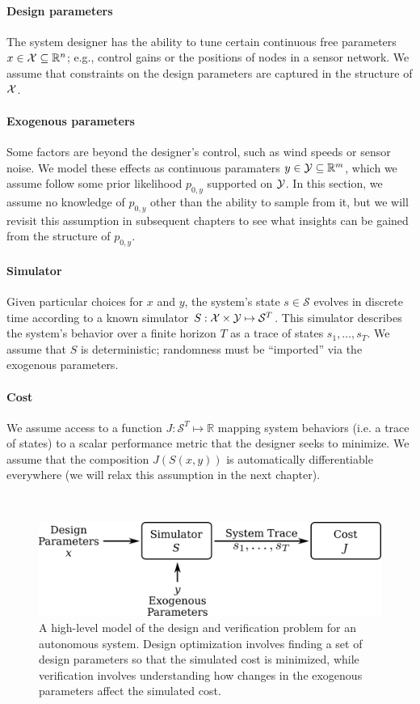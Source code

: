 \paragraph{Design parameters} The system designer has the ability to tune certain continuous free parameters $x \in \mathcal{X} \subseteq \mathbb{R}^n$; e.g., control gains or the positions of nodes in a sensor network. We assume that constraints on the design parameters are captured in the structure of $\mathcal{X}$.

\paragraph{Exogenous parameters} Some factors are beyond the designer's control, such as wind speeds or sensor noise. We model these effects as continuous paramaters $y \in \mathcal{Y} \subseteq \mathbb{R}^m$, which we assume follow some prior likelihood $p_{0, y}$ supported on $\mathcal{Y}$. In this section, we assume no knowledge of $p_{0, y}$ other than the ability to sample from it, but we will revisit this assumption in subsequent chapters to see what insights can be gained from the structure of $p_{0, y}$.

\paragraph{Simulator} Given particular choices for $x$ and $y$, the system's state $s \in \mathcal{S}$ evolves in discrete time according to a known simulator $S : \mathcal{X} \times \mathcal{Y} \mapsto \mathcal{S}^T$. This simulator describes the system's behavior over a finite horizon $T$ as a trace of states $s_1, \ldots, s_T$. We assume that $S$ is deterministic; randomness must be ``imported'' via the exogenous parameters.

\paragraph{Cost} We assume access to a function $J: \mathcal{S}^T \mapsto \mathbb{R}$ mapping system behaviors (i.e. a trace of states) to a scalar performance metric that the designer seeks to minimize. We assume that the composition $J(S(x, y))$ is automatically differentiable everywhere (we will relax this assumption in the next chapter).

\ \\

\begin{figure}[tb]
    \centering
    \includegraphics[width=0.6\linewidth]{images/ch5/block_diagram.png}
    \caption{A high-level model of the design and verification problem for an autonomous system. Design optimization involves finding a set of design parameters so that the simulated cost is minimized, while verification involves understanding how changes in the exogenous parameters affect the simulated cost.}
    \label{ch5:fig:block_diagram}
\end{figure}

